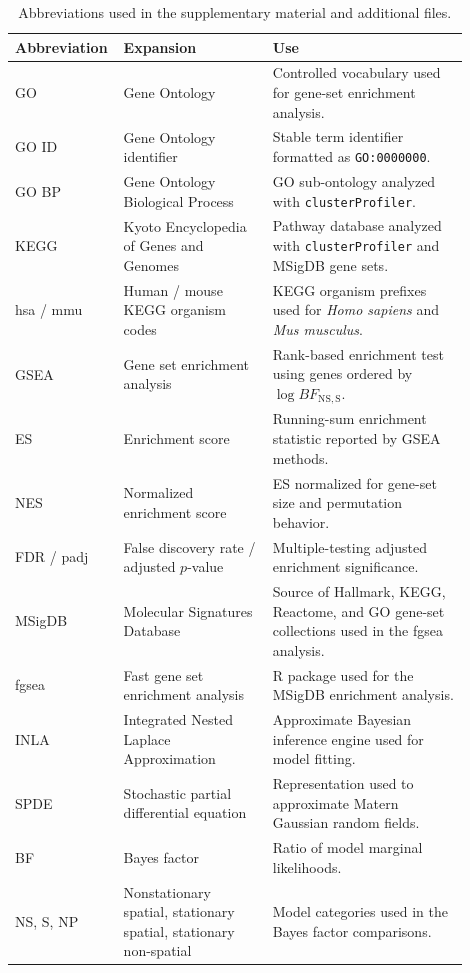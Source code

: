 \begin{table}[htbp]
\centering
\small
\caption{Abbreviations used in the supplementary material and additional files.}
\label{tab:abbreviations}
\begin{tabular}{p{0.16\linewidth}p{0.32\linewidth}p{0.42\linewidth}}
\toprule
Abbreviation & Expansion & Use\\
\midrule
GO & Gene Ontology & Controlled vocabulary used for gene-set enrichment analysis.\\
GO ID & Gene Ontology identifier & Stable term identifier formatted as \texttt{GO:0000000}.\\
GO BP & Gene Ontology Biological Process & GO sub-ontology analyzed with \texttt{clusterProfiler}.\\
KEGG & Kyoto Encyclopedia of Genes and Genomes & Pathway database analyzed with \texttt{clusterProfiler} and MSigDB gene sets.\\
hsa / mmu & Human / mouse KEGG organism codes & KEGG organism prefixes used for \textit{Homo sapiens} and \textit{Mus musculus}.\\
GSEA & Gene set enrichment analysis & Rank-based enrichment test using genes ordered by \(\log BF_{\mathrm{NS,S}}\).\\
ES & Enrichment score & Running-sum enrichment statistic reported by GSEA methods.\\
NES & Normalized enrichment score & ES normalized for gene-set size and permutation behavior.\\
FDR / padj & False discovery rate / adjusted \(p\)-value & Multiple-testing adjusted enrichment significance.\\
MSigDB & Molecular Signatures Database & Source of Hallmark, KEGG, Reactome, and GO gene-set collections used in the fgsea analysis.\\
fgsea & Fast gene set enrichment analysis & R package used for the MSigDB enrichment analysis.\\
INLA & Integrated Nested Laplace Approximation & Approximate Bayesian inference engine used for model fitting.\\
SPDE & Stochastic partial differential equation & Representation used to approximate Matern Gaussian random fields.\\
BF & Bayes factor & Ratio of model marginal likelihoods.\\
NS, S, NP & Nonstationary spatial, stationary spatial, stationary non-spatial & Model categories used in the Bayes factor comparisons.\\
\bottomrule
\end{tabular}
\end{table}


